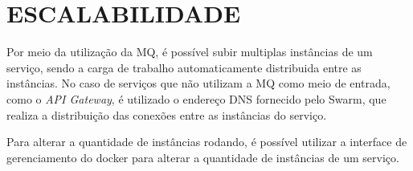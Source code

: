 \section{ESCALABILIDADE}

Por meio da utilização da \ac{MQ}, é possível subir multiplas instâncias de um serviço,
sendo a carga de trabalho automaticamente distribuida entre as instâncias. No caso de
serviços que não utilizam a \ac{MQ} como meio de entrada, como o \emph{API Gateway},
é utilizado o endereço \ac{DNS} fornecido pelo Swarm, que realiza a distribuição das
conexões entre as instâncias do serviço.

Para alterar a quantidade de instâncias rodando, é possível utilizar a interface de
gerenciamento do docker para alterar a quantidade de instâncias de um serviço.

